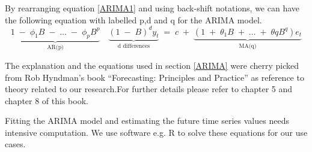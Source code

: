 By rearranging equation \ref{ARIMA1} and using back-shift notations, we can have the following equation with labelled p,d and q for the ARIMA model.
$$
\underbrace{1\;-\;\phi_{1}B\;-\;\dotsc\;-\;\phi_{p}B^p}_\text{AR(p)}\quad \underbrace{(1\;-\;B)^d y_{t}}_\text{d differences}\;=\;c\;+\;\underbrace{(1\;+\;\theta_{1}B\;+\;\dotsc\;+\;\theta{q}B^q)e_{t}}_\text{MA(q)}
$$

The explanation and the equations used in section \ref{ARIMA} were cherry picked from Rob Hyndman's book ``Forecasting: Principles and Practice'' \cite{hyndman2014forecasting} as reference to theory related to our research.For further details please refer to chapter 5 and chapter 8 of this book.

Fitting the ARIMA model and estimating the future time series values needs intensive computation. We use software e.g. R to solve these equations for our use cases. 




 
  






 


